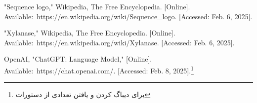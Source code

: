 \begin{thebibliography}{1}
        \begin{latin}
            "Sequence logo," Wikipedia, The Free Encyclopedia. [Online]. \\
            Available: https://en.wikipedia.org/wiki/Sequence\_logo. [Accessed: Feb. 6, 2025].
        \end{latin}

        \begin{latin}
            "Xylanase," Wikipedia, The Free Encyclopedia. [Online]. \\
            Available: https://en.wikipedia.org/wiki/Xylanase. [Accessed: Feb. 6, 2025].
        \end{latin}

        \begin{latin}
            OpenAI, "ChatGPT: Language Model," [Online]. Available: https://chat.openai.com/. [Accessed: Feb. 8, 2025].\footnote{برای دیباگ کردن و یافتن تعدادی از دستورات}
        \end{latin}

    \end{thebibliography}